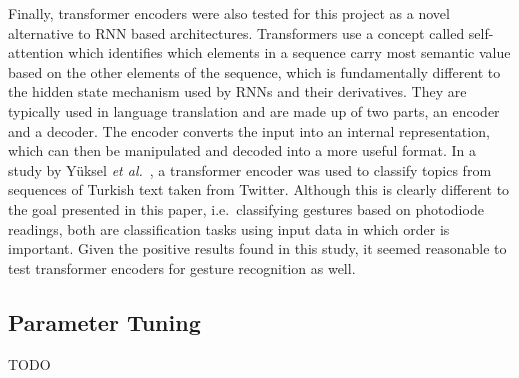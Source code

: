 Finally, transformer encoders were also tested for this project as a novel alternative to RNN based architectures.
Transformers use a concept called self-attention which identifies which elements in a sequence carry most semantic value based on the other elements of the sequence, which is fundamentally different to the hidden state mechanism used by RNNs and their derivatives.
They are typically used in language translation and are made up of two parts, an encoder and a decoder.
The encoder converts the input into an internal representation, which can then be manipulated and decoded into a more useful format.
In a study by Y{\"u}ksel \textit{et al.}~\cite{yuksel-etal-2019-turkish}, a transformer encoder was used to classify topics from sequences of Turkish text taken from Twitter.
Although this is clearly different to the goal presented in this paper, i.e.\ classifying gestures based on photodiode readings, both are classification tasks using input data in which order is important.
Given the positive results found in this study, it seemed reasonable to test transformer encoders for gesture recognition as well.

\subsection{Parameter Tuning}\label{subsec:frame-size}
TODO
